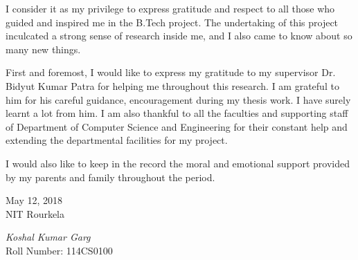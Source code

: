 \thispagestyle{empty} 
\noindent 


I consider it as my privilege to express gratitude and respect to all those who guided
and inspired me in the B.Tech project. The undertaking of this project inculcated a
strong sense of research inside me, and I also came to know about so many new things.

\par 
First and foremost, I would like to express my gratitude to my supervisor Dr.
Bidyut Kumar Patra for helping me throughout this research. I am grateful to
him for his careful guidance, encouragement during my thesis work. I have surely
learnt a lot from him. I am also thankful to all the faculties and supporting staff
of Department of Computer Science and Engineering for their constant help and
extending the departmental facilities for my project.


\par 
I would also like to keep in the record the moral and emotional support provided
by my parents and family throughout the period.

\vspace{15mm}
\begin{minipage}{.45\linewidth}
\begin{flushleft}
May 12, 2018\\
NIT Rourkela
\end{flushleft}
\end{minipage}
\begin{minipage}{.45\linewidth}
\begin{flushright}
\textit{Koshal Kumar Garg}\\
Roll Number: 114CS0100
\end{flushright}
\end{minipage}